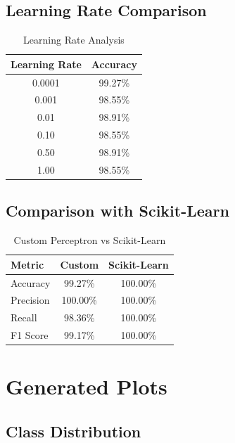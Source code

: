 \documentclass[12pt,a4paper]{article}
\begin{document}

\subsection{Learning Rate Comparison}

\begin{table}[H]
\centering
\caption{Learning Rate Analysis}
\begin{tabular}{cc}
\toprule
Learning Rate & Accuracy\\
\midrule
0.0001 & 99.27\%\\
0.001 & 98.55\%\\
0.01 & 98.91\%\\
0.10 & 98.55\%\\
0.50 & 98.91\%\\
1.00 & 98.55\%\\
\bottomrule
\end{tabular}
\end{table}


\subsection{Comparison with Scikit-Learn}

\begin{table}[H]
\centering
\caption{Custom Perceptron vs Scikit-Learn}
\begin{tabular}{lcc}
\toprule
Metric & Custom & Scikit-Learn\\
\midrule
Accuracy & 99.27\% & 100.00\%\\
Precision & 100.00\% & 100.00\%\\
Recall & 98.36\% & 100.00\%\\
F1 Score & 99.17\% & 100.00\%\\
\bottomrule
\end{tabular}
\end{table}


\section{Generated Plots}



\subsection{Class Distribution}
\end{document}
